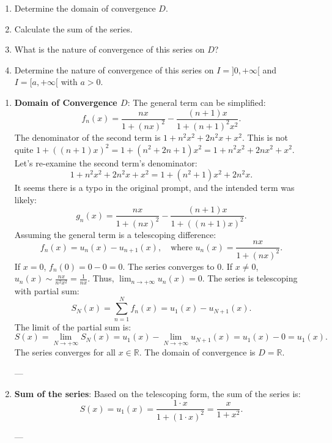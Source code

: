 \documentclass[12pt]{article}
\begin{document}
\begin{enumerate}
    \item Determine the domain of convergence $D$.
    \item Calculate the sum of the series.
    \item What is the nature of convergence of this series on $D$?
    \item Determine the nature of convergence of this series on $I = ]0, +\infty[$ and $I = [a, +\infty[$ with $a > 0$.
\end{enumerate}

\begin{correctionbox}
\begin{enumerate}
    \item \textbf{Domain of Convergence $D$}:
    The general term can be simplified:
    $$ f_n(x) = \frac{nx}{1+(nx)^2} - \frac{(n+1)x}{1+(n+1)^2x^2}. $$
    The denominator of the second term is $1+n^2x^2+2n^2x+x^2$. This is not quite $1+((n+1)x)^2 = 1+(n^2+2n+1)x^2 = 1+n^2x^2+2nx^2+x^2$.
    Let's re-examine the second term's denominator:
    $$ 1+n^2x^2+2n^2x+x^2 = 1 + (n^2+1)x^2 + 2n^2x. $$
    It seems there is a typo in the original prompt, and the intended term was likely:
    $$ g_n(x) = \frac{nx}{1+(nx)^2} - \frac{(n+1)x}{1+((n+1)x)^2}. $$
    Assuming the general term is a telescoping difference:
    $$ f_n(x) = u_n(x) - u_{n+1}(x), \quad \text{where } u_n(x) = \frac{nx}{1+(nx)^2}. $$
    If $x=0$, $f_n(0) = 0 - 0 = 0$. The series converges to $0$.
    If $x \neq 0$, $u_n(x) \sim \frac{nx}{n^2x^2} = \frac{1}{nx}$. Thus, $\lim_{n \to +\infty} u_n(x) = 0$.
    The series is telescoping with partial sum:
    $$ S_N(x) = \sum_{n=1}^N f_n(x) = u_1(x) - u_{N+1}(x). $$
    The limit of the partial sum is:
    $$ S(x) = \lim_{N \to +\infty} S_N(x) = u_1(x) - \lim_{N \to +\infty} u_{N+1}(x) = u_1(x) - 0 = u_1(x). $$
    The series converges for all $x \in \mathbb{R}$.
    The domain of convergence is $D = \mathbb{R}$.

    ---

    \item \textbf{Sum of the series}:
    Based on the telescoping form, the sum of the series is:
    $$ S(x) = u_1(x) = \frac{1\cdot x}{1+(1\cdot x)^2} = \frac{x}{1+x^2}. $$

    ---


\end{enumerate}
\end{correctionbox}
\end{document}
